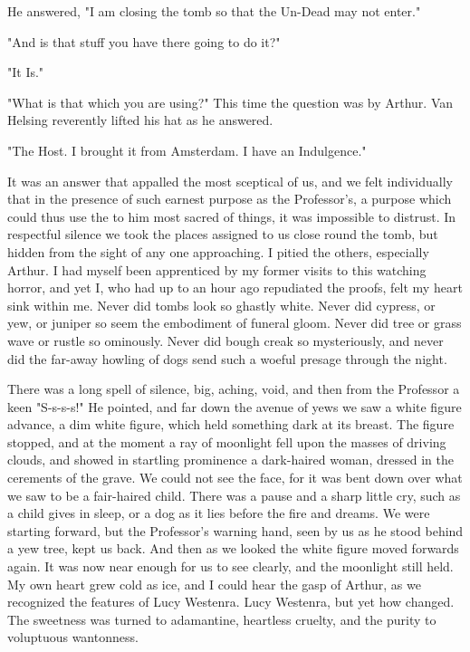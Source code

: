 He answered, "I am closing the tomb so that the Un-Dead may not enter." 

"And is that stuff you have there going to do it?" 

"It Is." 

"What is that which you are using?" This time the question was by Arthur. Van Helsing reverently lifted his hat as he answered. 

"The Host. I brought it from Amsterdam. I have an Indulgence." 

It was an answer that appalled the most sceptical of us, and we felt individually that in the presence of such earnest purpose as the Professor's, a purpose which could thus use the to him most sacred of things, it was impossible to distrust. In respectful silence we took the places assigned to us close round the tomb, but hidden from the sight of any one approaching. I pitied the others, especially Arthur. I had myself been apprenticed by my former visits to this watching horror, and yet I, who had up to an hour ago repudiated the proofs, felt my heart sink within me. Never did tombs look so ghastly white. Never did cypress, or yew, or juniper so seem the embodiment of funeral gloom. Never did tree or grass wave or rustle so ominously. Never did bough creak so mysteriously, and never did the far-away howling of dogs send such a woeful presage through the night. 

There was a long spell of silence, big, aching, void, and then from the Professor a keen "S-s-s-s!" He pointed, and far down the avenue of yews we saw a white figure advance, a dim white figure, which held something dark at its breast. The figure stopped, and at the moment a ray of moonlight fell upon the masses of driving clouds, and showed in startling prominence a dark-haired woman, dressed in the cerements of the grave. We could not see the face, for it was bent down over what we saw to be a fair-haired child. There was a pause and a sharp little cry, such as a child gives in sleep, or a dog as it lies before the fire and dreams. We were starting forward, but the Professor's warning hand, seen by us as he stood behind a yew tree, kept us back. And then as we looked the white figure moved forwards again. It was now near enough for us to see clearly, and the moonlight still held. My own heart grew cold as ice, and I could hear the gasp of Arthur, as we recognized the features of Lucy Westenra. Lucy Westenra, but yet how changed. The sweetness was turned to adamantine, heartless cruelty, and the purity to voluptuous wantonness. 

